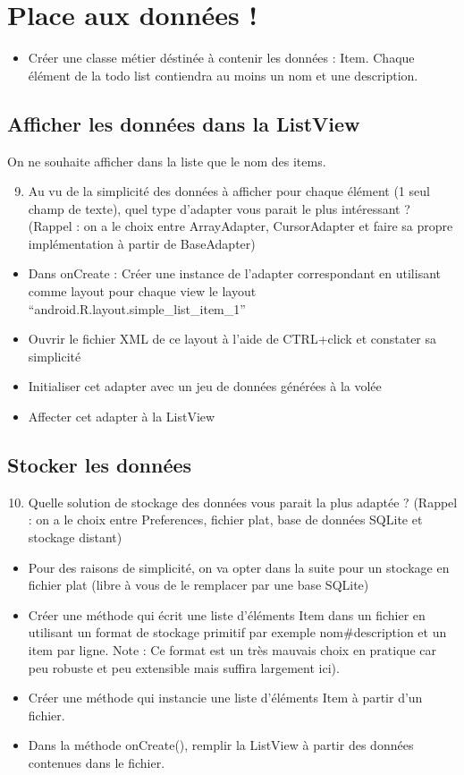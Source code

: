 \documentclass{article}
\begin{document}
 \section{Place aux données !}
 \begin{itemize}
  \item Créer une classe métier déstinée à contenir les données : Item. Chaque
  élément de la todo list contiendra au moins un nom et une description.
 \end{itemize}
 \subsection{Afficher les données dans la ListView}
 
    On ne souhaite afficher dans la liste que le nom des items.
      \begin{enumerate}
 \setcounter{enumi}{8}
\item Au vu de la simplicité des données à afficher pour chaque élément (1
seul champ de texte), quel type d'adapter vous parait le plus intéressant ?
(Rappel :
on a le choix entre ArrayAdapter, CursorAdapter et faire sa propre implémentation à partir de BaseAdapter)
\end{enumerate}
 \begin{itemize}
  \item Dans onCreate : Créer une instance de l'adapter correspondant en
  utilisant comme layout pour chaque view le layout ``android.R.layout.simple\_list\_item\_1''
  \item Ouvrir le fichier XML de ce layout à l'aide de CTRL+click et constater
  sa simplicité
  \item Initialiser cet adapter avec un jeu de données générées
  à la volée
  \item Affecter cet adapter à la ListView
 \end{itemize}
  \subsection{Stocker les données}
  \begin{enumerate}
 \setcounter{enumi}{9}
\item Quelle solution de stockage des données vous parait la plus adaptée ?
(Rappel : on a le choix entre Preferences, fichier plat, base de données SQLite et stockage distant)
\end{enumerate}
 \begin{itemize}
  \item Pour des raisons de simplicité, on va opter dans la suite pour un stockage en fichier plat (libre à vous de le remplacer par une base SQLite)
  \item Créer une méthode qui écrit une liste d'éléments Item dans un
  fichier en utilisant un format de stockage primitif par exemple
  nom\#description et un item par ligne. Note : Ce format est un très mauvais
  choix en pratique car peu robuste et peu extensible mais suffira largement ici).
  \item Créer une méthode qui instancie une liste d'éléments Item à partir d'un fichier.
  \item Dans la méthode onCreate(), remplir la ListView à partir des données contenues dans le fichier.
 \end{itemize}
\end{document}
